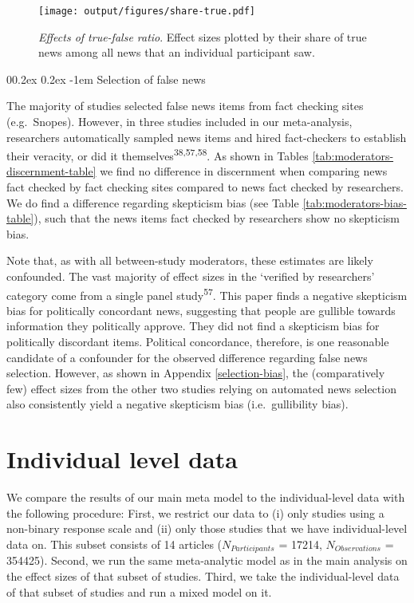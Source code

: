 \documentclass[
  man]{apa6}
\makeatletter
\let\oldparagraph\paragraph
\renewcommand{\paragraph}{
    \@ifstar
      \xxxParagraphStar
      \xxxParagraphNoStar
  }
\newcommand{\xxxParagraphStar}[1]{\oldparagraph*{#1}\mbox{}}
\newcommand{\xxxParagraphNoStar}[1]{\oldparagraph{#1}\mbox{}}
\renewcommand{\paragraph}{\@startsection{paragraph}{4}{\parindent}%
  {0\baselineskip \@plus 0.2ex \@minus 0.2ex}%
  {-1em}%
  {\normalfont\normalsize\bfseries\itshape\typesectitle}}
\makeatother
\begin{document}
\begin{figure}
\centering
\texttt{[image: output/figures/share-true.pdf]}
\caption{\label{fig:share-true}\emph{Effects of true-false ratio}. Effect sizes plotted by their share of true news among all news that an individual participant saw.}
\end{figure}

\paragraph{Selection of false news}\label{selection-of-false-news}

The majority of studies selected false news items from fact checking sites (e.g.~Snopes). However, in three studies included in our meta-analysis, researchers automatically sampled news items and hired fact-checkers to establish their veracity, or did it themselves\textsuperscript{38,57,58}. As shown in Tables \ref{tab:moderators-discernment-table} we find no difference in discernment when comparing news fact checked by fact checking sites compared to news fact checked by researchers. We do find a difference regarding skepticism bias (see Table \ref{tab:moderators-bias-table}), such that the news items fact checked by researchers show no skepticism bias.

Note that, as with all between-study moderators, these estimates are likely confounded. The vast majority of effect sizes in the `verified by researchers' category come from a single panel study\textsuperscript{57}. This paper finds a negative skepticism bias for politically concordant news, suggesting that people are gullible towards information they politically approve. They did not find a skepticism bias for politically discordant items. Political concordance, therefore, is one reasonable candidate of a confounder for the observed difference regarding false news selection. However, as shown in Appendix \ref{selection-bias}, the (comparatively few) effect sizes from the other two studies relying on automated news selection also consistently yield a negative skepticism bias (i.e.~gullibility bias).

\clearpage

\section{Individual level data}\label{individual-level}

\FloatBarrier

We compare the results of our main meta model to the individual-level data with the following procedure: First, we restrict our data to (i) only studies using a non-binary response scale and (ii) only those studies that we have individual-level data on. This subset consists of 14 articles (\(N_{Participants}\) = 17214, \(N_{Observations}\) = 354425). Second, we run the same meta-analytic model as in the main analysis on the effect sizes of that subset of studies. Third, we take the individual-level data of that subset of studies and run a mixed model on it.
\end{document}

